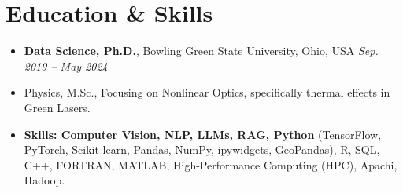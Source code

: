 \documentclass[a4paper,10pt]{article}
\begin{document}
\section*{Education \& Skills}

\begin{itemize}
    
    \item \textbf{Data Science, Ph.D.}, Bowling Green State University, Ohio, USA \hfill \textit{Sep. 2019 -- May 2024}
    
    \item Physics, M.Sc., Focusing on Nonlinear Optics, specifically thermal effects in Green Lasers.
    
    \item \textbf{Skills: Computer Vision, NLP, LLMs, RAG, Python} (TensorFlow, PyTorch, Scikit-learn, Pandas, NumPy, ipywidgets, GeoPandas), R, SQL, C++, FORTRAN, MATLAB, High-Performance Computing (HPC), Apachi, Hadoop.
    
\end{itemize}
\end{document}
